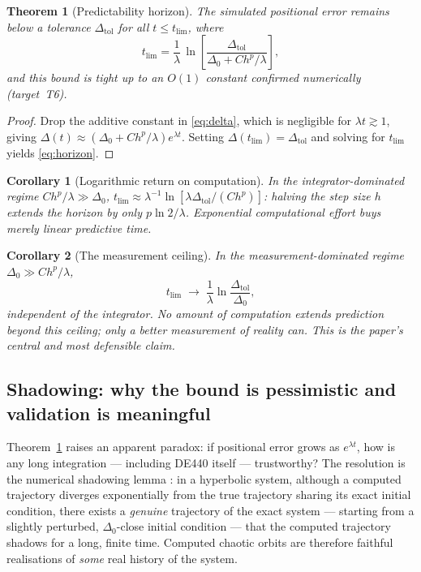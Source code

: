 \documentclass[11pt]{article}
\newtheorem{theorem}{Theorem}
\newtheorem{corollary}{Corollary}
\theoremstyle{definition}
\begin{document}
\begin{theorem}[Predictability horizon]
\label{thm:horizon}
The simulated positional error remains below a tolerance
$\Delta_{\mathrm{tol}}$ for all $t \le t_{\mathrm{lim}}$, where
\begin{equation}
\label{eq:horizon}
t_{\mathrm{lim}}
= \frac{1}{\lambda}\,
\ln\!\left[\frac{\Delta_{\mathrm{tol}}}
{\Delta_0 + C h^{p}/\lambda}\right],
\end{equation}
and this bound is tight up to an $O(1)$ constant confirmed numerically
\textup{(target~T6)}.
\end{theorem}
\begin{proof}
Drop the additive constant in \eqref{eq:delta}, which is negligible for
$\lambda t \gtrsim 1$, giving $\Delta(t) \approx (\Delta_0 + Ch^p/\lambda)
e^{\lambda t}$. Setting $\Delta(t_{\mathrm{lim}}) = \Delta_{\mathrm{tol}}$ and
solving for $t_{\mathrm{lim}}$ yields \eqref{eq:horizon}.
\end{proof}

\begin{corollary}[Logarithmic return on computation]
\label{cor:log}
In the integrator-dominated regime $Ch^p/\lambda \gg \Delta_0$,
$t_{\mathrm{lim}} \approx \lambda^{-1}\ln[\lambda\Delta_{\mathrm{tol}}/(Ch^p)]$:
halving the step size $h$ extends the horizon by only $p\ln 2/\lambda$.
Exponential computational effort buys merely linear predictive time.
\end{corollary}

\begin{corollary}[The measurement ceiling]
\label{cor:ceiling}
In the measurement-dominated regime $\Delta_0 \gg Ch^p/\lambda$,
\begin{equation}
t_{\mathrm{lim}} \;\longrightarrow\;
\frac{1}{\lambda}\ln\!\frac{\Delta_{\mathrm{tol}}}{\Delta_0},
\end{equation}
\emph{independent of the integrator}. No amount of computation extends
prediction beyond this ceiling; only a better measurement of reality can. This
is the paper's central and most defensible claim.
\end{corollary}

\subsection{Shadowing: why the bound is pessimistic and validation is meaningful}
\label{sec:shadowing}
Theorem~\ref{thm:horizon} raises an apparent paradox: if positional error grows
as $e^{\lambda t}$, how is any long integration --- including DE440 itself ---
trustworthy? The resolution is the numerical shadowing lemma
\cite{anosov1967, bowen1975, hyg1987}: in a hyperbolic system, although a
computed trajectory diverges exponentially from the true trajectory sharing its
exact initial condition, there exists a \emph{genuine} trajectory of the exact
system --- starting from a slightly perturbed, $\Delta_0$-close initial
condition --- that the computed trajectory shadows for a long, finite time.
Computed chaotic orbits are therefore faithful realisations of \emph{some} real
history of the system.
\end{document}
